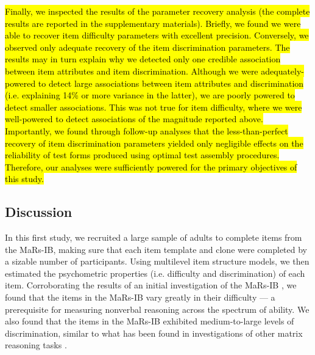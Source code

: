 \documentclass[a4paper,man,natbib]{apa6}
\begin{document}
\hl{Finally, we inspected the results of the parameter recovery analysis (the complete results are reported in the supplementary materials). Briefly, we found we were able to recover item difficulty parameters with excellent precision. Conversely, we observed only adequate recovery of the item discrimination parameters. The results may in turn explain why we detected only one credible association between item attributes and item discrimination. Although we were adequately-powered to detect large associations between item attributes and discrimination (i.e. explaining 14\% or more variance in the latter), we are poorly powered to detect smaller associations. This was not true for item difficulty, where we were well-powered to detect associations of the magnitude reported above. Importantly, we found through follow-up analyses that the less-than-perfect recovery of item discrimination parameters yielded only negligible effects on the reliability of test forms produced using optimal test assembly procedures. Therefore, our analyses were sufficiently powered for the primary objectives of this study.}

\subsection{Discussion}

In this first study, we recruited a large sample of adults to complete items from the MaRs-IB, making sure that each item template and clone were completed by a sizable number of participants. Using multilevel item structure models, we then estimated the psychometric properties (i.e. difficulty and discrimination) of each item. Corroborating the results of an initial investigation of the MaRs-IB \citep{chierchia2019matrix}, we found that the items in the MaRs-IB vary greatly in their difficulty --- a prerequisite for measuring nonverbal reasoning across the spectrum of ability. We also found that the items in the MaRs-IB exhibited medium-to-large levels of discrimination, similar to what has been found in investigations of other matrix reasoning tasks \citep{chiesi2012using, chiesi2012item, van2013shortened}.
\end{document}
